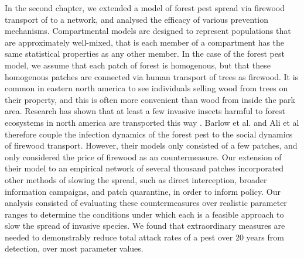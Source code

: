 In the second chapter, we extended a model of forest pest spread via firewood transport of \cite{barlow2014modelling} to a network, and analysed the efficacy of various prevention mechanisms. Compartmental models are designed to represent populations that are approximately well-mixed, that is each member of a compartment has the same statistical properties as any other member. In the case of the forest pest model, we assume that each patch of forest is homogenous, but that these homogenous patches are connected via human transport of trees as firewood. It is common in eastern north america to see individuals selling wood from trees on their property, and this is often more convenient than wood from inside the park area. Research has shown that at least a few invasive insects harmful to forest ecosystems in north america are transported this way \cite{koch2014using, tobin2010does, haack2010incidence}. Barlow et al. \cite{barlow2014modelling} and Ali et al \cite{ali2015coupled} therefore couple the infection dynamics of the forest pest to the social dynamics of firewood transport. However, their models only consisted of a few patches, and only considered the price of firewood as an countermeasure. Our extension of their model to an empirical network of several thousand patches \cite{koch2014using} incorporated other methods of slowing the spread, such as direct interception, broader information campaigns, and patch quarantine, in order to inform policy. Our analysis consisted of evaluating these countermeasures over realistic parameter ranges to determine the conditions under which each is a feasible approach to slow the spread of invasive species. We found that extraordinary measures are needed to demonstrably reduce total attack rates of a pest over 20 years from detection, over most parameter values.

